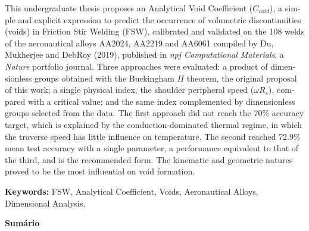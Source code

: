 \documentclass[12pt,openany]{report}
\begin{document}
\vspace{1.8cm}

\begin{otherlanguage}{english}
This undergraduate thesis proposes an Analytical Void Coefficient ($C_{void}$), a simple and explicit expression to predict the occurrence of volumetric discontinuities (voids) in Friction Stir Welding (FSW), calibrated and validated on the 108 welds of the aeronautical alloys AA2024, AA2219 and AA6061 compiled by Du, Mukherjee and DebRoy (2019), published in \textit{npj Computational Materials}, a \textit{Nature} portfolio journal. Three approaches were evaluated: a product of dimensionless groups obtained with the Buckingham $\Pi$ theorem, the original proposal of this work; a single physical index, the shoulder peripheral speed ($\omega R_s$), compared with a critical value; and the same index complemented by dimensionless groups selected from the data. The first approach did not reach the 70\% accuracy target, which is explained by the conduction-dominated thermal regime, in which the traverse speed has little influence on temperature. The second reached 72.9\% mean test accuracy with a single parameter, a performance equivalent to that of the third, and is the recommended form. The kinematic and geometric natures proved to be the most influential on void formation.

\vspace{1.0cm}
\noindent \textbf{Keywords:} FSW, Analytical Coefficient, Voids, Aeronautical Alloys, Dimensional Analysis.
\end{otherlanguage}

\newpage


\begin{center}
    {\fontsize{18}{22}\selectfont\bfseries Sumário\par}
\end{center}
\vspace{1.5cm}

\begin{singlespace}
\makeatletter
{}
\makeatother
\end{singlespace}

\newpage
{}\setcounter{paginaspre}{\value{page}}
\setcounter{page}{\value{paginaspre}}
\end{document}
